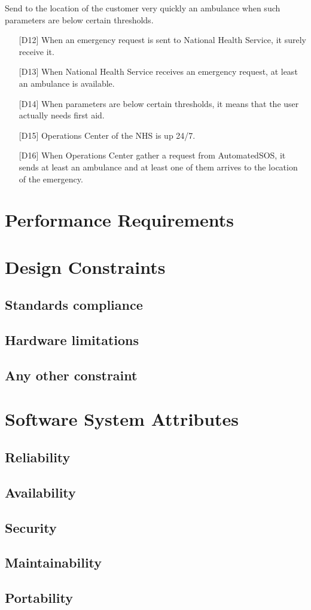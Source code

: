 \begin{enumerate} [resume, label={[G\arabic*]}]
    \item Send to the location of the customer very quickly an ambulance when such parameters are below certain thresholds. 
        \begin{itemize}
            \item [{[D12]}] When an emergency request is sent to National Health Service, it surely receive it.
            \item [{[D13]}] When National Health Service receives an emergency request, at least an ambulance is available.
            \item [{[D14]}] When  parameters  are  below  certain  thresholds,  it  means  that  the  user actually needs first aid.
            \item [{[D15]}] Operations Center of the NHS is up 24/7.
            \item [{[D16]}] When Operations Center gather a request from AutomatedSOS, it sends at least an ambulance and at least one of them arrives to the location of the emergency.
        \end{itemize}
\end{enumerate}


\section{Performance Requirements}

\section{Design Constraints}
\subsection{Standards compliance}
\subsection{Hardware limitations}
\subsection{Any other constraint}

\section{Software System Attributes}
\subsection{Reliability}
\subsection{Availability}
\subsection{Security}
\subsection{Maintainability}
\subsection{Portability}